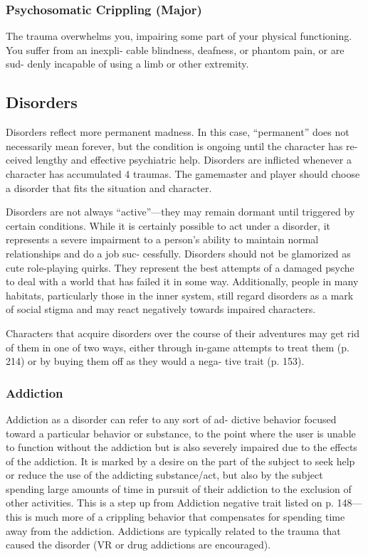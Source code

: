 \subsubsection{Psychosomatic Crippling (Major)}

The trauma overwhelms you, impairing some part of 
your physical functioning. You suffer from an inexpli-
cable blindness, deafness, or phantom pain, or are sud-
denly incapable of using a limb or other extremity.

\subsection{Disorders}

Disorders reflect more permanent madness. In this 
case, ``permanent'' does not necessarily mean forever, 
but the condition is ongoing until the character has re-
ceived lengthy and effective psychiatric help. Disorders 
are inflicted whenever a character has accumulated 4 
traumas. The gamemaster and player should choose a 
disorder that fits the situation and character.

Disorders are not always ``active''—they may 
remain dormant until triggered by certain conditions. 
While it is certainly possible to act under a disorder, 
it represents a severe impairment to a person's ability 
to maintain normal relationships and do a job suc-
cessfully. Disorders should not be glamorized as cute 
role-playing quirks. They represent the best attempts 
of a damaged psyche to deal with a world that has 
failed it in some way. Additionally, people in many 
habitats, particularly those in the inner system, still 
regard disorders as a mark of social stigma and may 
react negatively towards impaired characters.

Characters that acquire disorders over the course 
of their adventures may get rid of them in one of two 
ways, either through in-game attempts to treat them 
(p. 214) or by buying them off as they would a nega-
tive trait (p. 153).

\subsubsection{Addiction}

Addiction as a disorder can refer to any sort of ad-
dictive behavior focused toward a particular behavior 
or substance, to the point where the user is unable 
to function without the addiction but is also severely 
impaired due to the effects of the addiction. It is 
marked by a desire on the part of the subject to seek 
help or reduce the use of the addicting substance/act, 
but also by the subject spending large amounts of time 
in pursuit of their addiction to the exclusion of other 
activities. This is a step up from Addiction negative 
trait listed on p. 148—this is much more of a crippling 
behavior that compensates for spending time away 
from the addiction. Addictions are typically related 
to the trauma that caused the disorder (VR or drug 
addictions are encouraged).

